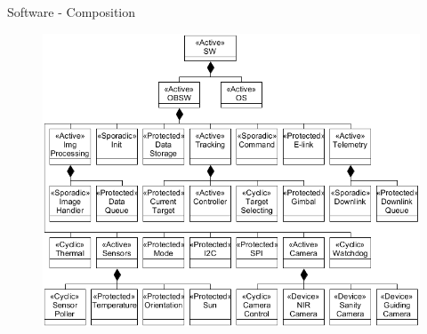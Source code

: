 \documentclass[11pt, aspectratio=169]{beamer}
\begin{document}
\begin{frame}[c]{Software - Composition}
    \begin{figure}
        \includegraphics[height=.9\textheight]{software/composition-tree.png}
    \end{figure}
\end{frame}
\end{document}
